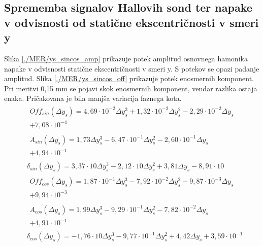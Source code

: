 \subsection{Sprememba signalov Hallovih sond ter napake v odvisnosti od statične ekscentričnosti v smeri y}
Slika \ref{./MER/ys_sincos_amp} prikazuje potek amplitud osnovnega hamonika napake v odvisnosti statične ekscentričnosti v smeri y. S potekov se opazi padanje amplitud.
Slika \ref{./MER/ys_sincos_off} prikazuje potek enosmernih komponent. Pri meritvi 0,15 mm se pojavi skok enosmernih komponent, vendar razlika ostaja enaka.
Pričakovana je bila manjša variacija faznega kota.
\begin{eqnarray}
&\begin{split}Off_{sin}(\Delta y_s) =4,69\cdot 10^{-2}\Delta y_s^{3}+1,32\cdot 10^{-2}\Delta y_s^{2}-2,29\cdot 10^{-2}\Delta y_s\\+7,08\cdot 10^{-4}\end{split} \\
&\begin{split}A_{sin}(\Delta y_s) =1,73\Delta y_s^{3}-6,47\cdot 10^{-1}\Delta y_s^{2}-2,60\cdot 10^{-1}\Delta y_s\\+4,94\cdot 10^{-1} \end{split}\\               
&\delta_{sin}(\Delta y_s) =3,37\cdot 10\Delta y_s^{3}-2,12\cdot 10\Delta y_s^{2}+3,81\Delta y_s-8,91\cdot 10 \\                         
&\begin{split}Off_{cos}(\Delta y_s) =1,87\cdot 10^{-1}\Delta y_s^{3}-7,92\cdot 10^{-2}\Delta y_s^{2}-9,87\cdot 10^{-3}\Delta y_s\\+9,94\cdot 10^{-3} \end{split}\\
&\begin{split}A_{cos}(\Delta y_s) =1,99\Delta y_s^{3}-9,29\cdot 10^{-1}\Delta y_s^{2}-7,82\cdot 10^{-2}\Delta y_s\\+4,91\cdot 10^{-1} \end{split}\\               
&\delta_{cos}(\Delta y_s) =-1,76\cdot 10\Delta y_s^{3}-9,77\cdot 10^{-1}\Delta y_s^{2}+4,42\Delta y_s+3,59\cdot 10^{-1}
\end{eqnarray}


